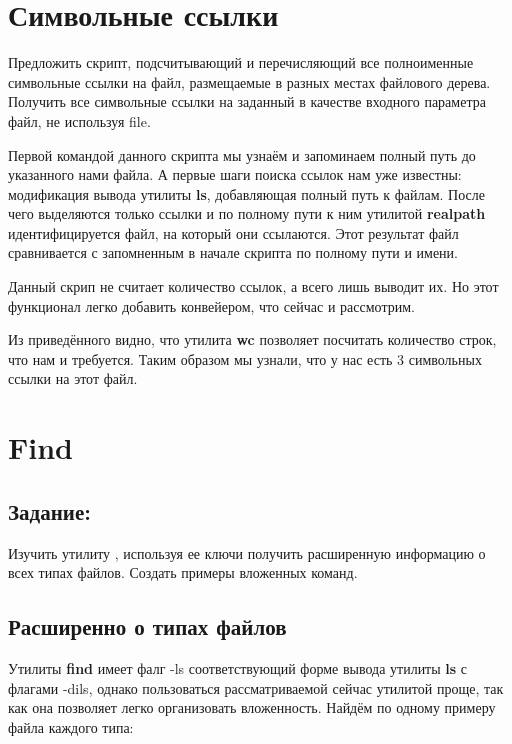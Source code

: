 \documentclass[a4paper]{article}
\begin{document}
\section{Символьные ссылки} Предложить скрипт, подсчитывающий и перечисляющий все полноименные символьные ссылки на файл, размещаемые в разных местах файлового дерева. Получить все символьные ссылки на заданный в качестве входного параметра файл, не используя file.



Первой командой данного скрипта мы узнаём и запоминаем полный путь до указанного нами файла. А первые шаги поиска ссылок нам уже известны: модификация вывода утилиты \textbf{ls}, добавляющая полный путь к файлам. После чего выделяются только ссылки и по полному пути к ним утилитой \textbf{realpath} идентифицируется файл, на который они ссылаются. Этот результат файл сравнивается с запомненным в начале скрипта по полному пути и имени.

Данный скрип не считает количество ссылок, а всего лишь выводит их. Но этот функционал легко добавить конвейером, что сейчас и рассмотрим.

Из приведённого видно, что утилита \textbf{wc} позволяет посчитать количество строк, что нам и требуется. Таким образом мы узнали, что у нас есть 3 символьных ссылки на этот файл.

\section{Find} \subsection{Задание:}Изучить утилиту , используя ее ключи получить расширенную информацию о всех типах файлов. Создать примеры вложенных команд.
\subsection{Расширенно о типах файлов}
Утилиты \textbf{find} имеет фалг -ls соответствующий форме вывода утилиты \textbf{ls} с флагами -dils, однако пользоваться рассматриваемой сейчас утилитой проще, так как она позволяет легко организовать вложенность. Найдём по одному примеру файла каждого типа:

\end{document}
